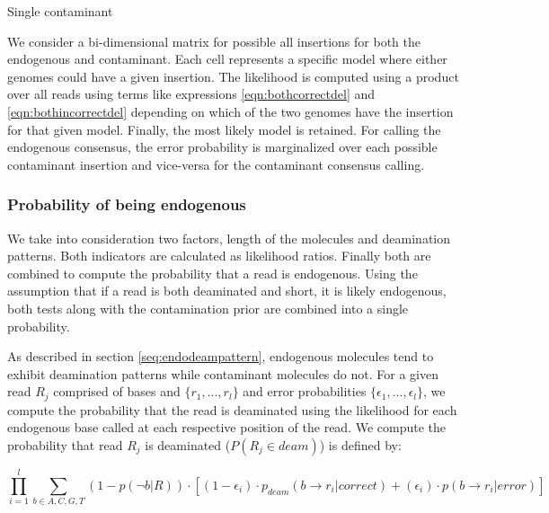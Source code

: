 \documentclass[a4paper,12pt]{article}
\begin{document}
\noindent Single contaminant

We consider a bi-dimensional matrix for possible all insertions for both the endogenous and contaminant. Each cell represents a specific model where either genomes could have a given insertion. The likelihood is computed using a product over all reads using terms like expressions \ref{eqn:bothcorrectdel} and \ref{eqn:bothincorrectdel} depending on which of the two genomes have the insertion for that given model. Finally, the most likely model is retained. For calling the endogenous consensus, the error probability is marginalized over each possible contaminant insertion and vice-versa for the contaminant consensus calling. 



\subsubsection{Probability of being endogenous}
\label{sec:priorendo}

We take into consideration two factors, length of the molecules and deamination patterns. Both indicators are calculated as likelihood ratios. Finally both are combined to compute the probability that a read is endogenous. Using the assumption that if a read is both deaminated and short, it is likely endogenous, both tests along with the contamination prior are combined into a single probability. 


As described in section \ref{seq:endodeampattern}, endogenous molecules tend to exhibit deamination patterns while contaminant molecules do not. For a given read $R_j$ comprised of bases and $\{ r_1, ..., r_l \}$ and error probabilities $\{ \epsilon_1, ..., \epsilon_l \}$, we compute the probability that the read is deaminated using the likelihood for each endogenous base called at each respective position of the read. We compute the probability that read $R_j$ is deaminated ($P(R_j \in deam) $) is defined by:


\begin{equation}
 \prod_{i=1}^{l} \sum_{b \in {A,C,G,T} }  (1-p(\neg b|R)) \cdot 
[ (1-\epsilon_i) \cdot p_{deam}(b \to r_i | correct)
  + 
  (\epsilon_i) \cdot p(b \to r_i | error)  
]
\end{equation} 
\end{document}
